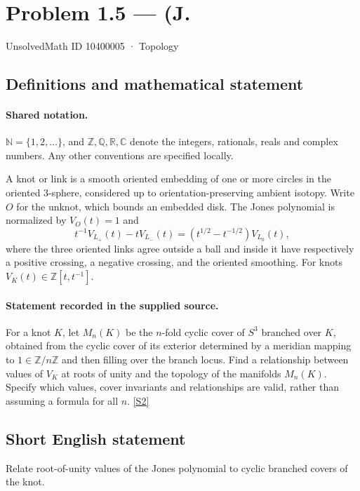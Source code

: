\documentclass[11pt]{article}
\newcommand{\sref}[2]{\hyperlink{source:#1:#2}{[S#2]}}
\begin{document}
\setcounter{section}{10400004}
\section{Problem 1.5 — (J.}\label{10400005}
{\small\sffamily UnsolvedMath ID 10400005 · Topology}
\subsection{Definitions and mathematical statement}

\paragraph{Shared notation.}$\mathbb N=\{1,2,\ldots\}$, and $\mathbb Z,\mathbb Q,\mathbb R,\mathbb C$ denote the integers, rationals, reals and complex numbers. Any other conventions are specified locally.


A knot or link is a smooth oriented embedding of one or more circles in the oriented $3$-sphere, considered up to orientation-preserving ambient isotopy. Write $O$ for the unknot, which bounds an embedded disk. The Jones polynomial is normalized by $V_O(t)=1$ and
\[t^{-1}V_{L_+}(t)-tV_{L_-}(t)=(t^{1/2}-t^{-1/2})V_{L_0}(t),\]
where the three oriented links agree outside a ball and inside it have respectively a positive crossing, a negative crossing, and the oriented smoothing. For knots $V_K(t)\in\mathbb Z[t,t^{-1}]$.
\paragraph{Statement recorded in the supplied source.}
For a knot $K$, let $M_n(K)$ be the $n$-fold cyclic cover of $S^3$ branched over $K$, obtained from the cyclic cover of its exterior determined by a meridian mapping to $1\in\mathbb Z/n\mathbb Z$ and then filling over the branch locus. Find a relationship between values of $V_K$ at roots of unity and the topology of the manifolds $M_n(K)$. Specify which values, cover invariants and relationships are valid, rather than assuming a formula for all $n$. \sref{10400005}{2}
\subsection{Short English statement}
Relate root-of-unity values of the Jones polynomial to cyclic branched covers of the knot.
\end{document}
